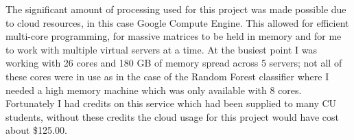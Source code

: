 \documentclass[11pt]{article}
\begin{document}
The significant amount of processing used for this project was made possible due to cloud resources, in this case Google Compute Engine. This allowed for efficient multi-core programming, for massive matrices to be held in memory and for me to work with multiple virtual servers at a time. At the busiest point I was working with 26 cores and 180 GB of memory spread across 5 servers; not all of these cores were in use as in the case of the Random Forest classifier where I needed a high memory machine which was only available with 8 cores. Fortunately I had credits on this service which had been supplied to many CU students, without these credits the cloud usage for this project would have cost about \$125.00.


{}
\end{document}

